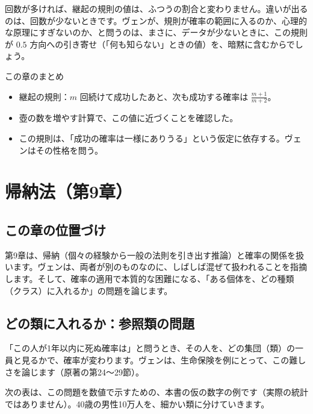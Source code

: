 \documentclass[a4paper,11pt,openany]{ltjsbook}
\begin{document}
回数が多ければ、継起の規則の値は、ふつうの割合と変わりません。違いが出るのは、回数が少ないときです。ヴェンが、規則が確率の範囲に入るのか、心理的な原理にすぎないのか、と問うのは、まさに、データが少ないときに、この規則が $0.5$ 方向への引き寄せ（「何も知らない」ときの値）を、暗黙に含むからでしょう。

\begin{pointbox}{この章のまとめ}
\begin{itemize}[leftmargin=*]
\item 継起の規則：$m$ 回続けて成功したあと、次も成功する確率は $\frac{m+1}{m+2}$。
\item 壺の数を増やす計算で、この値に近づくことを確認した。
\item この規則は、「成功の確率は一様にありうる」という仮定に依存する。ヴェンはその性格を問う。
\end{itemize}
\end{pointbox}

\chapter{帰納法（第9章）}

\section{この章の位置づけ}

第9章は、帰納（個々の経験から一般の法則を引き出す推論）と確率の関係を扱います。ヴェンは、両者が別のものなのに、しばしば混ぜて扱われることを指摘します。そして、確率の適用で本質的な困難になる、「ある個体を、どの種類（クラス）に入れるか」の問題を論じます。

\section{どの類に入れるか：参照類の問題}

「この人が1年以内に死ぬ確率は」と問うとき、その人を、どの集団（類）の一員と見るかで、確率が変わります。ヴェンは、生命保険を例にとって、この難しさを論じます（原著の第24〜29節）。

次の表は、この問題を数値で示すための、本書の仮の数字の例です（実際の統計ではありません）。40歳の男性10万人を、細かい類に分けていきます。
\end{document}

